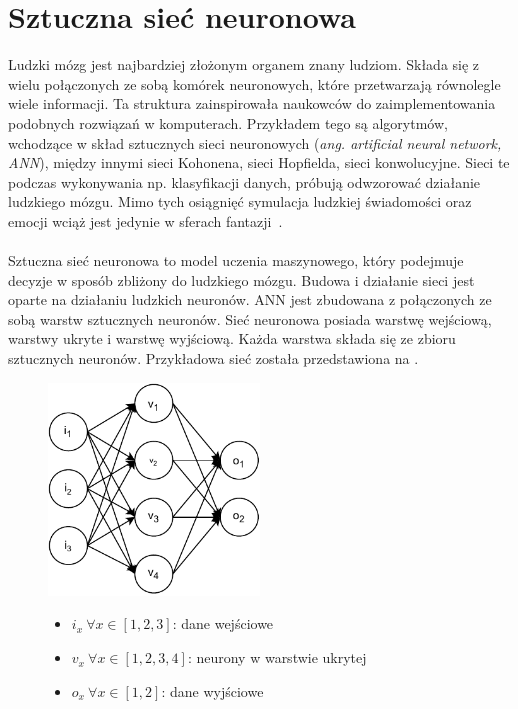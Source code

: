 \section{Sztuczna sieć neuronowa}
\label{sec:snn}
Ludzki mózg jest najbardziej złożonym organem znany ludziom. Składa się z wielu połączonych ze sobą komórek neuronowych, które przetwarzają równolegle wiele informacji. Ta struktura zainspirowała naukowców do zaimplementowania podobnych rozwiązań w komputerach. Przykładem tego są algorytmów, wchodzące w skład sztucznych sieci neuronowych (\textit{ang. artificial neural network, ANN}), między innymi sieci Kohonena, sieci Hopfielda, sieci konwolucyjne. Sieci te podczas wykonywania np. klasyfikacji danych, próbują odwzorować działanie ludzkiego mózgu. Mimo tych osiągnięć symulacja ludzkiej świadomości oraz emocji wciąż jest jedynie w sferach fantazji~\cite{Wang2003}.
\\ \\
Sztuczna sieć neuronowa to model uczenia maszynowego, który podejmuje decyzje w sposób zbliżony do ludzkiego mózgu. Budowa i działanie sieci jest oparte na działaniu ludzkich neuronów. ANN jest zbudowana z połączonych ze sobą warstw sztucznych neuronów. Sieć neuronowa posiada warstwę wejściową, warstwy ukryte i warstwę wyjściową. Każda warstwa składa się ze zbioru sztucznych neuronów. Przykładowa sieć została przedstawiona na .
\begin{figure}[H]
    \centering
    \includegraphics[width=0.5\textwidth]{images/neural-network}
    \begin{itemize}
        \item[] $i_x \ \forall x \in [1, 2, 3]$: dane wejściowe
        \item[] $v_x \ \forall x \in [1, 2, 3, 4]$: neurony w warstwie ukrytej
        \item[] $o_x \ \forall x \in [1, 2]$: dane wyjściowe
    \end{itemize}
    \label{fig:neural-network}
\end{figure}


